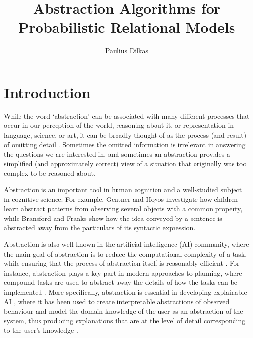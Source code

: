 \documentclass{article}
\begin{document}
\title{Abstraction Algorithms for Probabilistic Relational Models}
\author{Paulius Dilkas}
\maketitle

\section{Introduction}

While the word `abstraction' can be associated with many different
processes that occur in our perception of the world, reasoning about it, or
representation in language, science, or art, it can be broadly thought of as the
process (and result) of omitting detail \cite{doi:10.1086/670300}. Sometimes the
omitted information is irrelevant in answering the questions we are interested
in, and sometimes an abstraction provides a simplified (and approximately
correct) view of a situation that originally was too complex to be reasoned
about.

Abstraction is an important tool in human cognition and a well-studied subject
in cognitive science. For example, Gentner and Hoyos \cite{Gentner2017-GENAAA-2}
investigate how children learn abstract patterns from observing several
objects with a common property, while Bransford and Franks
\cite{BRANSFORD1971331} show how the idea conveyed by a sentence is abstracted
away from the particulars of its syntactic expression.

Abstraction is also well-known in the artificial intelligence (AI) community,
where the main goal of abstraction is to reduce the computational complexity of
a task, while ensuring that the process of abstraction itself is reasonably
efficient \cite{saitta2013abstraction}. For instance, abstraction plays a key
part in modern approaches to planning, where compound tasks are used to abstract
away the details of how the tasks can be implemented
\cite{DBLP:journals/amai/ErolHN96}. More specifically, abstraction is essential
in developing explainable AI \cite{DBLP:journals/access/AdadiB18}, where
it has been used to create interpretable abstractions of observed behaviour
\cite{DBLP:journals/corr/PenkovR17} and model the domain knowledge of the user
as an abstraction of the system, thus producing explanations that are at the
level of detail corresponding to the user's knowledge
\cite{DBLP:conf/ijcai/SreedharanSK18}.
\end{document}
